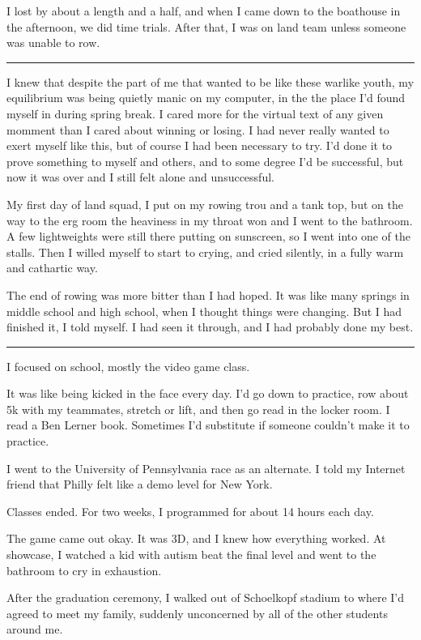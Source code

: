 I lost by about a length and a half, and when I came down to the boathouse in
the afternoon, we did time trials.  After that, I was on land team unless
someone was unable to row.

\plainfancybreak{12pt}{2}{* * *}

I knew that despite the part of me that wanted to be like these warlike youth,
my equilibrium was being quietly manic on my computer, in the the place I'd
found myself in during spring break.  I cared more for the virtual text of any
given momment than I cared about winning or losing.  I had never really wanted
to exert myself like this, but of course I had been necessary to try.  I'd done
it to prove something to myself and others, and to some degree I'd be
successful, but now it was over and I still felt alone and unsuccessful.

My first day of land squad, I put on my rowing trou and a tank top, but on the
way to the erg room the heaviness in my throat won and I went to the bathroom.
A few lightweights  were still there putting on sunscreen, so I went into one of
the stalls.  Then I willed myself to start to crying, and cried silently, in a
fully warm and cathartic way.  

The end of rowing was more bitter than I had hoped.  It was like many springs in
middle school and high school, when I thought things were changing.  But I had
finished it, I told myself.  I had seen it through, and I had probably done my
best.


\plainfancybreak{12pt}{2}{* * *}

I focused on school, mostly the video game class.

It was like being kicked in the face every day.  I'd go down to practice, row
about 5k with my teammates, stretch or lift, and then go read in the locker
room.  I read a Ben Lerner book.  Sometimes I'd substitute if someone couldn't
make it to practice.

I went to the University of Pennsylvania race as an alternate.  I told my
Internet friend that Philly felt like a demo level for New York.

Classes ended.  For two weeks, I programmed for about 14 hours each day.  

The game came out okay.  It was 3D, and I knew how everything worked.  At
showcase, I watched a kid with autism beat the final level and went to the
bathroom to cry in exhaustion.

After the graduation ceremony, I walked out of Schoelkopf stadium to where I'd
agreed to meet my family, suddenly unconcerned by all of the other students
around me.

